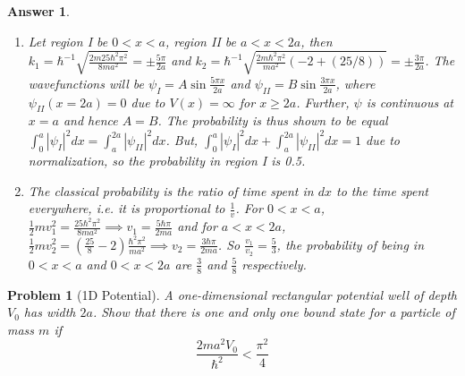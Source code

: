 \documentclass[a4paper]{article}
\newtheorem{ans}{Answer}[section]
\theoremstyle{new}
\newtheorem{qns}{Problem}[section]
\begin{document}
\begin{ans}\leavevmode
\begin{enumerate}[label=(\alph*)]
\item 
Let region I be $0<x<a$, region II be $a<x<2a$, then $k_1=\hbar^{-1}\sqrt{\frac{2m25\hbar^2\pi^2}{8ma^2}}=\pm\frac{5\pi}{2a}$ and $k_2=\hbar^{-1}\sqrt{\frac{2m\hbar^2\pi^2}{ma^2}(-2+(25/8))}=\pm\frac{3\pi}{2a}$. The wavefunctions will be $\psi_I=A\sin\frac{5\pi x}{2a}$ and $\psi_{II}=B\sin\frac{3\pi x}{2a}$, where $\psi_{II}(x=2a)=0$ due to $V(x)=\infty$ for $x\geq2a$. Further, $\psi$ is continuous at $x=a$ and hence $A=B$. The probability is thus shown to be equal $\int_0^a|\psi_I|^2dx=\int_a^{2a}|\psi_{II}|^2dx$. But, $\int_0^a|\psi_I|^2dx+\int_a^{2a}|\psi_{II}|^2dx=1$ due to normalization, so the probability in region I is 0.5.
\item The classical probability is the ratio of time spent in $dx$ to the time spent everywhere, i.e. it is proportional to $\frac{1}{v}$. For $0<x<a$, $\frac{1}{2}mv_1^2=\frac{25\hbar^2\pi^2}{8ma^2}\implies v_1=\frac{5\hbar\pi}{2ma}$ and for $a<x<2a$, $\frac{1}{2}mv_2^2=(\frac{25}{8}-2)\frac{\hbar^2\pi^2}{ma^2}\implies v_2=\frac{3\hbar\pi}{2ma}$. So $\frac{v_1}{v_2}=\frac{5}{3}$, the probability of being in $0<x<a$ and $0<x<2a$ are $\frac{3}{8}$ and $\frac{5}{8}$ respectively.  
\end{enumerate}
\end{ans}
\newpage
\begin{qns}[1D Potential]
A one-dimensional rectangular potential well of depth $V_0$ has width $2a$. Show that there is one and only one bound state for a particle of mass $m$ if
$$\frac{2ma^2V_0}{\hbar^2}<\frac{\pi^2}{4}$$
\end{qns}
\end{document}
